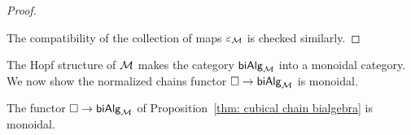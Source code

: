 \begin{proof}
\begin{center}
		\qquad
		\qquad
	\end{center}
	The compatibility of the collection of maps $\varepsilon_{\mathcal{M}}$ is checked similarly.
\end{proof}
The Hopf structure of $\mathcal{M}$ makes the category $\mathsf{biAlg}_{\mathcal{M}}$ into a monoidal category. We now show the normalized chains functor $\square \to \mathsf{biAlg}_{\mathcal{M}}$ is monoidal.
\begin{theorem} \label{chainsismonoidal}
	The functor $\square \to \mathsf{biAlg}_{\mathcal{M}}$ of Proposition~\ref{thm: cubical chain bialgebra} is monoidal.
\end{theorem}

